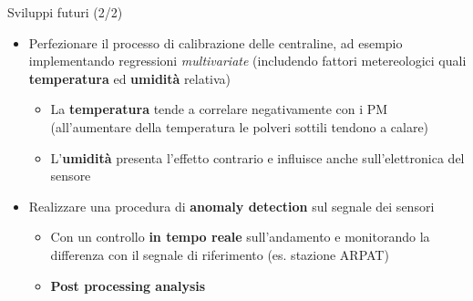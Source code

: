 \begin{frame}{Sviluppi futuri (2/2)}
\begin{itemize}
  \item Perfezionare il processo di calibrazione delle centraline, ad esempio implementando regressioni \textit{multivariate} (includendo fattori metereologici quali \textbf{temperatura} ed \textbf{umidità} relativa)\vspace{0.1cm}
  \begin{itemize}
    \item La \textbf{temperatura} tende a correlare negativamente con i PM (all'aumentare della temperatura le polveri sottili tendono a calare)
    \item L'\textbf{umidità} presenta l'effetto contrario e influisce anche sull'elettronica del sensore
  \end{itemize}\vspace{0.1cm}
  \item Realizzare una procedura di \textbf{anomaly detection} sul segnale dei sensori\vspace{0.1cm}
  \begin{itemize}
    \item Con un controllo \textbf{in tempo reale} sull'andamento e monitorando la differenza con il segnale di riferimento (es. stazione ARPAT)
    \item \textbf{Post processing analysis}
  \end{itemize}
\end{itemize}
\end{frame}

